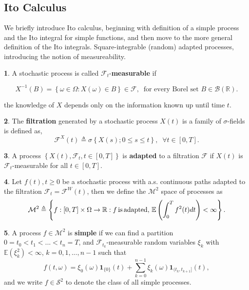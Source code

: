 \documentclass[british]{amsart} \usepackage{lmodern}
\numberwithin{equation}{section} \numberwithin{figure}{section}
\theoremstyle{plain} \newtheorem{thm}{\protect\theoremname}[section]
\theoremstyle{definition} \newtheorem{defn}[thm]{\protect\definitionname}
\theoremstyle{plain} \newtheorem{assumption}[thm]{\protect\assumptionname}
\theoremstyle{plain} \newtheorem{lem}[thm]{\protect\lemmaname}
\theoremstyle{plain} \newtheorem{prop}[thm]{\protect\propositionname}
\theoremstyle{remark} \newtheorem{rem}[thm]{\protect\remarkname}
\theoremstyle{plain} \newtheorem{cor}[thm]{\protect\corollaryname}
\begin{document}
\subsection{Ito Calculus}

We briefly introduce Ito calculus, beginning with definition of a simple process
and the Ito integral for simple functions, and then move to the more general
definition of the Ito integrals. Square-integrable (random) adapted processes,
introducing the notion of measureability. 


\begin{defn}
  A stochastic process is called $\mathcal{F}_{t}$-\textbf{measurable} if 

  \begin{equation}
    X^{-1}(B)=\left\{ \omega\in\Omega:X(\omega)\in B\right\} \in\mathcal{F},\;\;\text{for every Borel set }B\in\mathcal{B}(\mathbb{R}).
  \end{equation}

  the knowledge of $X$ depends only on the information known up until time $t$.
\end{defn}
%
\begin{defn}
The \textbf{filtration} generated by a stochastic process $X(t)$
is a family of $\sigma$-fields is defined as, 
\[
\mathcal{F}^{X}(t)\triangleq\sigma\left\{ X(s);0\le s\le t\right\} ,\;\;\forall t\in[0,T].
\]
\end{defn}
%
\begin{defn}
A process $\left\{ X(t),\mathcal{F}_{t},t\in[0,T]\right\} $ is \textbf{adapted}
to a filtration $\mathcal{F}$ if $X(t)$ is $\mathcal{F}_{t}$-measurable
for all $t\in[0,T]$. 
\end{defn}
%
\begin{defn}
Let $f(t),t\ge0$ be a stochastic process with a.s. continuous paths
adapted to the filtration $\mathcal{F}_{t}=\mathcal{F}^{W}(t)$, then
we define the $\mathcal{M}^{2}$ space of processes as
\[
\mathcal{M}^{2}\triangleq\left\{ f:[0,T]\times\Omega\to\mathbb{R}:f\,\text{is\,adapted},\,\mathbb{E}\left(\int_{0}^{T}f^{2}(t)dt\right)<\infty\right\} .
\]
\end{defn}
%
\begin{defn}
A process $f\in\mathcal{M}^{2}$ is \textbf{simple} if we can find
a partition $0=t_{0}<t_{1}<...<t_{n}=T$, and $\mathcal{F}_{t_{k}}$-measurable
random variables $\xi_{k}$ with $\mathbb{E}(\xi_{k}^{2})<\infty$,
$k=0,1,...,n-1$ such that
\[
f(t,\omega)=\xi_{0}(\omega)\mathbf{1}_{\{0\}}(t)+\sum_{k=0}^{n-1}\xi_{k}(\omega)\mathbf{1}_{(t_{k},t_{k+1}]}(t),
\]
 and we write $f\in\mathcal{S}^{2}$ to denote the class of all simple
processes.
\end{defn}
\end{document}
